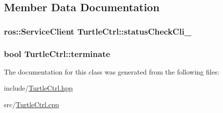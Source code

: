 \subsection{Member Data Documentation}
\subsubsection[{\texorpdfstring{status\+Check\+Cli\+\_\+}{statusCheckCli_}}]{\setlength{\rightskip}{0pt plus 5cm}ros\+::\+Service\+Client Turtle\+Ctrl\+::status\+Check\+Cli\+\_\+}\hypertarget{classTurtleCtrl_aa9a72ccbacd4c55c356ba0305ba14a4a}{}\label{classTurtleCtrl_aa9a72ccbacd4c55c356ba0305ba14a4a}
\subsubsection[{\texorpdfstring{terminate}{terminate}}]{\setlength{\rightskip}{0pt plus 5cm}bool Turtle\+Ctrl\+::terminate}\hypertarget{classTurtleCtrl_a0022c4d538eef753a0d49d4dfbdd4549}{}\label{classTurtleCtrl_a0022c4d538eef753a0d49d4dfbdd4549}


The documentation for this class was generated from the following files\+:\begin{DoxyCompactItemize}
\item 
include/\hyperlink{TurtleCtrl_8hpp}{Turtle\+Ctrl.\+hpp}\item 
src/\hyperlink{TurtleCtrl_8cpp}{Turtle\+Ctrl.\+cpp}\end{DoxyCompactItemize}
